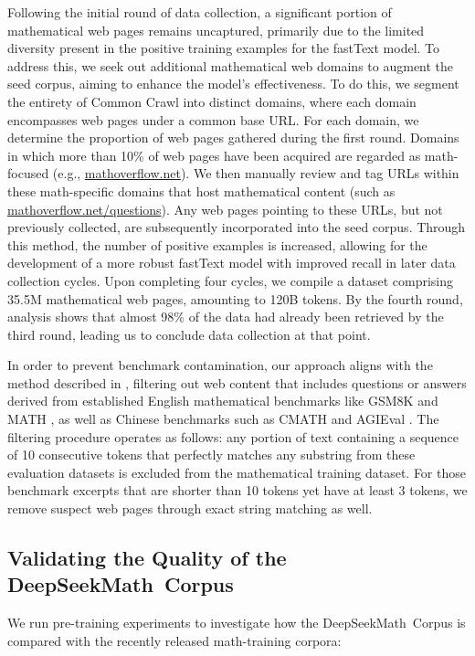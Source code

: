 \begin{itemize}[topsep=0pt]
Following the initial round of data collection, a significant portion of mathematical web pages remains uncaptured, primarily due to the limited diversity present in the positive training examples for the fastText model. To address this, we seek out additional mathematical web domains to augment the seed corpus, aiming to enhance the model’s effectiveness. To do this, we segment the entirety of Common Crawl into distinct domains, where each domain encompasses web pages under a common base URL. For each domain, we determine the proportion of web pages gathered during the first round. Domains in which more than 10\% of web pages have been acquired are regarded as math-focused (e.g., \url{mathoverflow.net}). We then manually review and tag URLs within these math-specific domains that host mathematical content (such as \url{mathoverflow.net/questions}). Any web pages pointing to these URLs, but not previously collected, are subsequently incorporated into the seed corpus. Through this method, the number of positive examples is increased, allowing for the development of a more robust fastText model with improved recall in later data collection cycles. Upon completing four cycles, we compile a dataset comprising 35.5M mathematical web pages, amounting to 120B tokens. By the fourth round, analysis shows that almost 98\% of the data had already been retrieved by the third round, leading us to conclude data collection at that point.

In order to prevent benchmark contamination, our approach aligns with the method described in \cite{deepseek-coder}, filtering out web content that includes questions or answers derived from established English mathematical benchmarks like GSM8K \citep{gsm8k} and MATH \citep{MATH}, as well as Chinese benchmarks such as CMATH \citep{wei2023cmath} and AGIEval \citep{agieval}. The filtering procedure operates as follows: any portion of text containing a sequence of 10 consecutive tokens that perfectly matches any substring from these evaluation datasets is excluded from the mathematical training dataset. For those benchmark excerpts that are shorter than 10 tokens yet have at least 3 tokens, we remove suspect web pages through exact string matching as well.

\subsection{Validating the Quality of the DeepSeekMath~Corpus}

We run pre-training experiments to investigate how the DeepSeekMath~Corpus is compared with the recently released math-training corpora:


\end{itemize}
